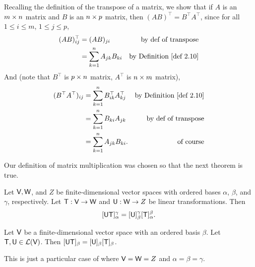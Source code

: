 \begin{additional theorem} \label{athm 2.24}
Recalling the definition of the transpose of a matrix, we show that if \(A\) is an \(m \times n\) matrix and \(B\) is an \(n \times p\) matrix, then \((AB)^\top = B^\top A^\top\), since for all \(1 \le i \le m\), \(1 \le j \le p\),
\begin{align*}
    (AB)^\top_{ij} & = (AB)_{ji} & \text{by def of transpose} \\
                   & = \sum_{k = 1}^n A_{jk} B_{ki} & \text{by \DEF{2.10}}
\end{align*}
And (note that \(B^\top\) is \(p \times n\) matrix, \(A^\top\) is \(n \times m\) matrix),
\begin{align*}
    (B^\top A^\top)_{ij} & = \sum_{k = 1}^n B^\top_{ik} A^\top_{kj} & \text{by \DEF{2.10}} \\
                         & = \sum_{k = 1}^n B_{ki} A_{jk} & \text{by def of transpose} \\
                         & = \sum_{k = 1}^n A_{jk} B_{ki}. & \text{of course}
\end{align*}
\end{additional theorem}

Our definition of matrix multiplication was chosen so that the next theorem is true.
\begin{theorem} \label{thm 2.11}
Let \(\textsf{V}, \textsf{W}\), and \(Z\) be finite-dimensional vector spaces with ordered bases \(\alpha\), \(\beta\), and \(\gamma\), respectively.
Let \(\textsf{T} : \textsf{V} \to \textsf{W}\) and \(\textsf{U} : \textsf{W} \to Z\) be linear transformations.
Then
\[
    [\textsf{U}\textsf{T}]_{\alpha}^{\gamma} = [\textsf{U}]_{\beta}^{\gamma}[\textsf{T}]_{\alpha}^{\beta}.
\]
\end{theorem}

\begin{corollary} \label{corollary 2.11.1}
Let \(\textsf{V}\) be a finite-dimensional vector space with an ordered
basis \(\beta\).
Let \(\textsf{T}, \textsf{U} \in \mathcal{L}(\textsf{V})\).
Then \([\textsf{U}\textsf{T}]_{\beta} = [\textsf{U}]_{\beta}[\textsf{T}]_{\beta}\).

This is just a particular case of  where \(\textsf{V} = \textsf{W} = Z\) and \(\alpha = \beta = \gamma\).
\end{corollary}

